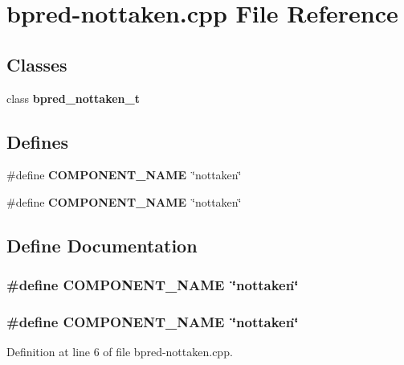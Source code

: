 \section{bpred-nottaken.cpp File Reference}
\label{bpred-nottaken_8cpp}
\subsection*{Classes}
\begin{CompactItemize}
\item 
class {\bf bpred\_\-nottaken\_\-t}
\end{CompactItemize}
\subsection*{Defines}
\begin{CompactItemize}
\item 
\#define {\bf COMPONENT\_\-NAME}~\char`\"{}nottaken\char`\"{}
\item 
\#define {\bf COMPONENT\_\-NAME}~\char`\"{}nottaken\char`\"{}
\end{CompactItemize}


\subsection{Define Documentation}
\subsubsection[{COMPONENT\_\-NAME}]{\setlength{\rightskip}{0pt plus 5cm}\#define COMPONENT\_\-NAME~\char`\"{}nottaken\char`\"{}}\label{zesto-bpred_8cpp_9146ade7ce24e3db226a973a59063892}


\subsubsection[{COMPONENT\_\-NAME}]{\setlength{\rightskip}{0pt plus 5cm}\#define COMPONENT\_\-NAME~\char`\"{}nottaken\char`\"{}}\label{bpred-nottaken_8cpp_9146ade7ce24e3db226a973a59063892}




Definition at line 6 of file bpred-nottaken.cpp.